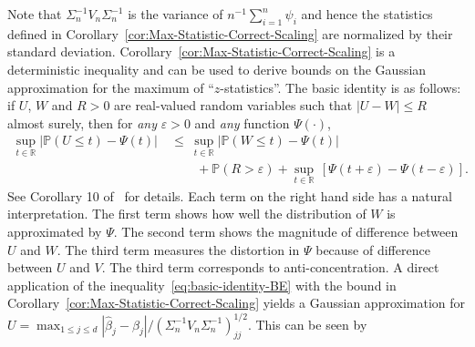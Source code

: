 \documentclass[11pt]{article}
\begin{document}
Note that $\Sigma_n^{-1}V_n\Sigma_n^{-1}$ is the variance of $n^{-1}\sum_{i=1}^n \psi_i$ and hence the statistics defined in Corollary~\ref{cor:Max-Statistic-Correct-Scaling} are normalized by their standard deviation. Corollary~\ref{cor:Max-Statistic-Correct-Scaling} is a deterministic inequality and can be used to derive bounds on the Gaussian approximation for the maximum of ``$z$-statistics''. The basic identity is as follows: if $U$, $W$ and $R > 0$ are real-valued random variables such that $|U - W| \le R$ almost surely, then for \emph{any} $\varepsilon > 0$ and \emph{any} function $\Psi(\cdot)$,
\begin{equation}\label{eq:basic-identity-BE}
\begin{split}
\sup_{t\in\mathbb{R}}|\mathbb{P}(U \le t) - \Psi(t)| ~&\le~ \sup_{t\in\mathbb{R}}|\mathbb{P}(W \le t) - \Psi(t)|\\ 
&\qquad+ \mathbb{P}(R > \varepsilon) + \sup_{t\in\mathbb{R}}\,[\Psi(t + \varepsilon) - \Psi(t-\varepsilon)].
\end{split}
\end{equation}
See Corollary 10 of~\cite{paulauskas1996rates} for details.
Each term on the right hand side has a natural interpretation. The first term shows how well the distribution of $W$ is approximated by $\Psi$. The second term shows the magnitude of difference between $U$ and $W$. The third term measures the distortion in $\Psi$ because of difference between $U$ and $V$. The third term corresponds to anti-concentration.  
A direct application of the inequality~\eqref{eq:basic-identity-BE} with the bound in Corollary~\ref{cor:Max-Statistic-Correct-Scaling} yields a Gaussian approximation for $U = \max_{1\le j\le d}|\widehat{\beta}_j - \beta_j|/(\Sigma_n^{-1}V_n\Sigma_n^{-1})_{jj}^{1/2}$. This can be seen by 
\end{document}
